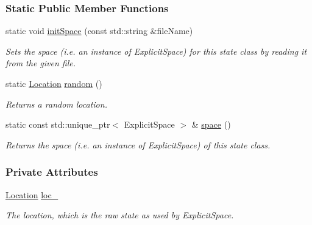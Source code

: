 \subsubsection*{Static Public Member Functions}
\begin{DoxyCompactItemize}
\item 
static void \hyperlink{structslb_1_1core_1_1sb_1_1ExplicitState_af02f7ca680be7105f85fd17d7fea87e7}{init\+Space} (const std\+::string \&file\+Name)
\begin{DoxyCompactList}\small\item\em Sets the space (i.\+e. an instance of Explicit\+Space) for this state class by reading it from the given file. \end{DoxyCompactList}\item 
static \hyperlink{structslb_1_1core_1_1sb_1_1ExplicitState_a0db984d44f46c477a6df3c9b062925f9}{Location} \hyperlink{structslb_1_1core_1_1sb_1_1ExplicitState_a48457e70133ab1b4d6357b221917cc11}{random} ()
\begin{DoxyCompactList}\small\item\em Returns a random location. \end{DoxyCompactList}\item 
static const std\+::unique\+\_\+ptr$<$ Explicit\+Space $>$ \& \hyperlink{structslb_1_1core_1_1sb_1_1ExplicitState_a18c5da0e54b1562f2a224f414694a80f}{space} ()
\begin{DoxyCompactList}\small\item\em Returns the space (i.\+e. an instance of Explicit\+Space) of this state class. \end{DoxyCompactList}\end{DoxyCompactItemize}
\subsubsection*{Private Attributes}
\begin{DoxyCompactItemize}
\item 
\hyperlink{structslb_1_1core_1_1sb_1_1ExplicitState_a0db984d44f46c477a6df3c9b062925f9}{Location} \hyperlink{structslb_1_1core_1_1sb_1_1ExplicitState_ae5a70068fa1e66171e4bd1a4c33bd02d}{loc\+\_\+}\hypertarget{structslb_1_1core_1_1sb_1_1ExplicitState_ae5a70068fa1e66171e4bd1a4c33bd02d}{}\label{structslb_1_1core_1_1sb_1_1ExplicitState_ae5a70068fa1e66171e4bd1a4c33bd02d}

\begin{DoxyCompactList}\small\item\em The location, which is the raw state as used by {\ttfamily Explicit\+Space}. \end{DoxyCompactList}\end{DoxyCompactItemize}
